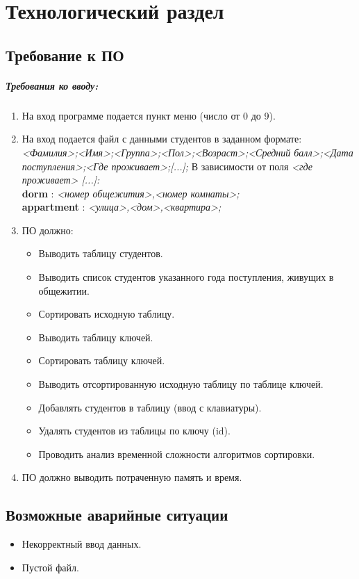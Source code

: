 \chapter{Технологический раздел}

\section{Требование к ПО}

\paragraph{Требования ко вводу: }

\begin{enumerate}
	\item На вход программе подается пункт меню (число от 0 до 9).
	\item На вход подается файл с данными студентов в заданном формате: \\
	\textit{<Фамилия>;<Имя>;<Группа>;<Пол>;<Возраст>;<Средний балл>;<Дата поступления>;<Где проживает>;[...];} В зависимости от поля \textit{<где проживает> [...]:} \\
	\textbf{dorm} : \textit{<номер общежития>,<номер комнаты>;} \\
	\textbf{appartment} : \textit{<улица>,<дом>,<квартира>;}
	\item ПО должно:
	\begin{itemize}
		\item Выводить таблицу студентов.
		\item Выводить список студентов указанного года поступления, живущих в общежитии.
		\item Сортировать исходную таблицу.
		\item Выводить таблицу ключей.
		\item Сортировать таблицу ключей.
		\item Выводить отсортированную исходную таблицу по таблице ключей.
		\item Добавлять студентов в таблицу (ввод с клавиатуры).
		\item Удалять студентов из таблицы по ключу (id).
		\item Проводить анализ временной сложности алгоритмов сортировки.
	\end{itemize}
	\item ПО должно выводить потраченную память и время.
\end{enumerate}

\section{Возможные аварийные ситуации}
\begin{itemize}
	\item Некорректный ввод данных.
	\item Пустой файл.
\end{itemize}


